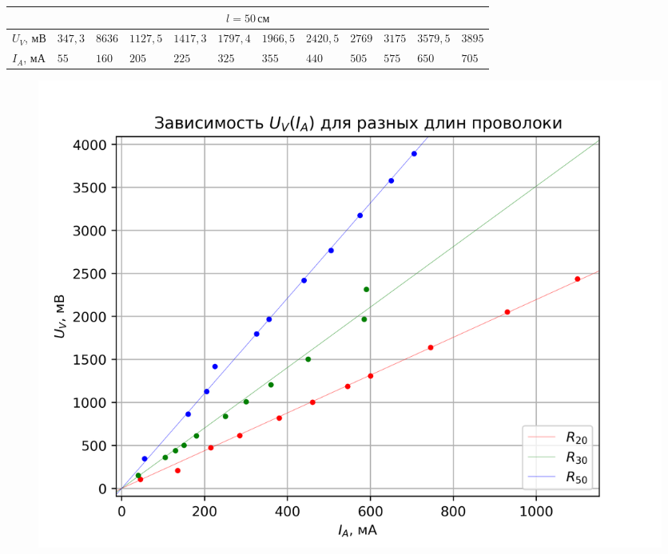 \begin{table}[t!]
\begin{tabular}{|llllllllllll|}
    \multicolumn{12}{|c|}{$l=50\,\text{см}$}                                                                                                                                                                                                                                                                                                                                                         \\ \hline
    \multicolumn{1}{|l|}{$U_V$, мВ}   & \multicolumn{1}{l|}{$347{,}3$} & \multicolumn{1}{l|}{$863{6}$}  & \multicolumn{1}{l|}{$1127{,}5$} & \multicolumn{1}{l|}{$1417{,}3$} & \multicolumn{1}{l|}{$1797{,}4$} & \multicolumn{1}{l|}{$1966{,}5$} & \multicolumn{1}{l|}{$2420{,}5$} & \multicolumn{1}{l|}{$2769$}     & \multicolumn{1}{l|}{$3175$}     & \multicolumn{1}{l|}{$3579{,}5$} & $3895$     \\ \hline
    \multicolumn{1}{|l|}{$I_A$, мА} & \multicolumn{1}{l|}{$55$}      & \multicolumn{1}{l|}{$160$}     & \multicolumn{1}{l|}{$205$}      & \multicolumn{1}{l|}{$225$}      & \multicolumn{1}{l|}{$325$}      & \multicolumn{1}{l|}{$355$}      & \multicolumn{1}{l|}{$440$}      & \multicolumn{1}{l|}{$505$}      & \multicolumn{1}{l|}{$575$}      & \multicolumn{1}{l|}{$650$}      & $705$      \\ \hline
    \end{tabular}
\end{table}

\begin{figure}[h!]
    \centering
    \includegraphics[width=\textwidth]{img/plot.png}
    \label{fig:circuit}
\end{figure}


